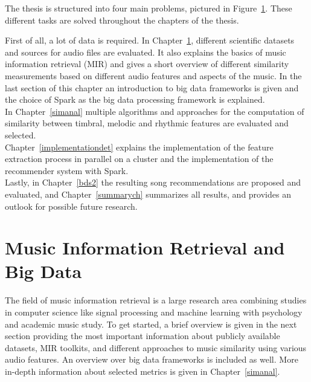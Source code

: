 \noindent The thesis is structured into four main problems, pictured in Figure~\ref{structh}. These different tasks are solved throughout the chapters of the thesis.

\begin{figure}[htbp]
	\centering
	\label{structh}
\end{figure}

\noindent First of all, a lot of data is required. In Chapter~\ref{audiofeat}, different scientific datasets and sources for audio files are evaluated. It also explains the basics of music information retrieval (MIR) and gives a short overview of different similarity measurements based on different audio features and aspects of the music. In the last section of this chapter an introduction to big data frameworks is given and the choice of Spark as the big data processing framework is explained.\\
In Chapter~\ref{simanal} multiple algorithms and approaches for the computation of similarity between timbral, melodic and rhythmic features are evaluated and selected.\\
Chapter~\ref{implementationdet} explains the implementation of the feature extraction process in parallel on a cluster and the implementation of the recommender system with Spark.\\
Lastly, in Chapter~\ref{bds2} the resulting song recommendations are proposed and evaluated, and Chapter~\ref{summarych} summarizes all results, and provides an outlook for possible future research. 


\chapter{Music Information Retrieval and Big Data}\label{audiofeat}

The field of music information retrieval is a large research area combining studies in computer science like signal processing and machine learning with psychology and academic music study. To get started, a brief overview is given in the next section providing the most important information about publicly available datasets, MIR toolkits, and different approaches to music similarity using various audio features. An overview over big data frameworks is included as well. More in-depth information about selected metrics is given in Chapter~\ref{simanal}. 

